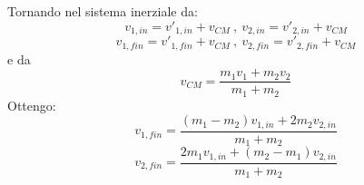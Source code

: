 \documentclass[class=book, crop=false, oneside, 12pt]{standalone}
\begin{document}
Tornando nel sistema inerziale da:
\begin{equation*}
    v_{1,in} = {v'}_{1,in} + v_{CM} \ , \ v_{2,in} = {v'}_{2,in} + v_{CM}
\end{equation*}
\begin{equation*}
    v_{1,fin} = {v'}_{1,fin} + v_{CM} \ , \ v_{2,fin} = {v'}_{2,fin} + v_{CM}
\end{equation*}
e da 
\begin{equation*}
    {v}_{CM} = \frac{m_1 {v}_1 + m_2 {v}_2}{m_1 + m_2}
\end{equation*}
Ottengo:
\begin{equation}
    v_{1,fin} = \frac{\left(m_1 - m_2\right)v_{1,in} + 2 m_2 v_{2,in} }{m_1 + m_2}
\end{equation}
\begin{equation}
    v_{2,fin} = \frac{2 m_1 v_{1,in} + \left(m_2 - m_1\right)v_{2,in} }{m_1 + m_2}
\end{equation}
\end{document}
